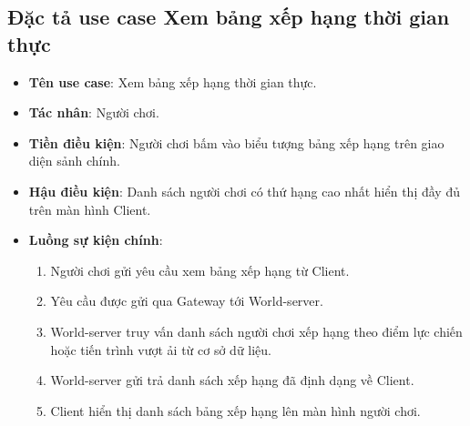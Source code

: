 \documentclass[../Project.tex]{subfiles}
\begin{document}
\subsection{Đặc tả use case Xem bảng xếp hạng thời gian thực}
\begin{itemize}
    \item \textbf{Tên use case}: Xem bảng xếp hạng thời gian thực.
    \item \textbf{Tác nhân}: Người chơi.
    \item \textbf{Tiền điều kiện}: Người chơi bấm vào biểu tượng bảng xếp hạng trên giao diện sảnh chính.
    \item \textbf{Hậu điều kiện}: Danh sách người chơi có thứ hạng cao nhất hiển thị đầy đủ trên màn hình Client.
    \item \textbf{Luồng sự kiện chính}:
    \begin{enumerate}
        \item Người chơi gửi yêu cầu xem bảng xếp hạng từ Client.
        \item Yêu cầu được gửi qua Gateway tới World-server.
        \item World-server truy vấn danh sách người chơi xếp hạng theo điểm lực chiến hoặc tiến trình vượt ải từ cơ sở dữ liệu.
        \item World-server gửi trả danh sách xếp hạng đã định dạng về Client.
        \item Client hiển thị danh sách bảng xếp hạng lên màn hình người chơi.
    \end{enumerate}
\end{itemize}
\end{document}
